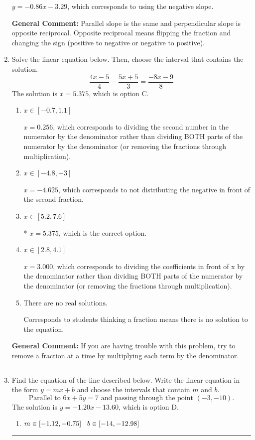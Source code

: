 \documentclass{extbook}[14pt]
\newcommand{\litem}[1]{\item #1

\rule{\textwidth}{0.4pt}}
\begin{document}
\begin{enumerate}
{\begin{enumerate}[label=\Alph*.]
 $y = -0.86x - 3.29$, which corresponds to using the negative slope.
\end{enumerate}

\textbf{General Comment:} Parallel slope is the same and perpendicular slope is opposite reciprocal. Opposite reciprocal means flipping the fraction and changing the sign (positive to negative or negative to positive).
}
\litem{
Solve the linear equation below. Then, choose the interval that contains the solution.
\[ \frac{4x -5}{4} - \frac{5x + 5}{3} = \frac{-8x -9}{8} \]The solution is \( x = 5.375 \), which is option C.\begin{enumerate}[label=\Alph*.]
\item \( x \in [-0.7, 1.1] \)

 $x = 0.256$, which corresponds to dividing the second number in the numerator by the denominator rather than dividing BOTH parts of the numerator by the denominator (or removing the fractions through multiplication).
\item \( x \in [-4.8, -3] \)

 $x = -4.625$, which corresponds to not distributing the negative in front of the second fraction.
\item \( x \in [5.2, 7.6] \)

* $x = 5.375$, which is the correct option.
\item \( x \in [2.8, 4.1] \)

 $x = 3.000$, which corresponds to dividing the coefficients in front of x by the denominator rather than dividing BOTH parts of the numerator by the denominator (or removing the fractions through multiplication).
\item \( \text{There are no real solutions.} \)

Corresponds to students thinking a fraction means there is no solution to the equation.
\end{enumerate}

\textbf{General Comment:} If you are having trouble with this problem, try to remove a fraction at a time by multiplying each term by the denominator.
}
\litem{
Find the equation of the line described below. Write the linear equation in the form $ y=mx+b $ and choose the intervals that contain $m$ and $b$.
\[ \text{Parallel to } 6 x + 5 y = 7 \text{ and passing through the point } (-3, -10). \]The solution is \( y = -1.20x - 13.60 \), which is option D.\begin{enumerate}[label=\Alph*.]
\item \( m \in [-1.12, -0.75] \hspace*{3mm} b \in [-14, -12.98] \)


\end{enumerate}}
\end{enumerate}
\end{document}
